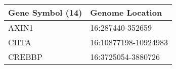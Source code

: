 \begin{tabular}{ll}
\toprule
Gene Symbol (14) &      Genome Location \\
\midrule
           AXIN1 &     16:287440-352659 \\
           CIITA & 16:10877198-10924983 \\
          CREBBP &   16:3725054-3880726 \\
\bottomrule
\end{tabular}
